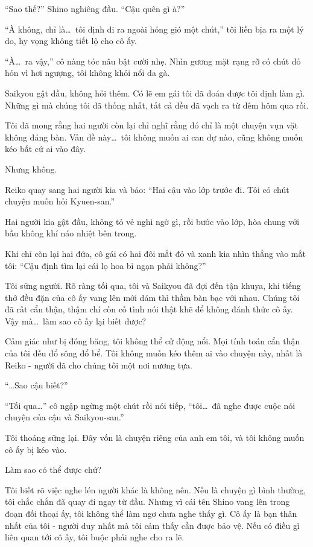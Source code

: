 \documentclass[../main.tex]{subfiles}
\begin{document}
``Sao thế?'' Shino nghiêng đầu. ``Cậu quên gì à?''

``À không, chỉ là\dots\ tôi định đi ra ngoài hóng gió một chút,'' tôi liền bịa ra một lý do, hy vọng không tiết lộ cho cô ấy.

``À\dots\ ra vậy,'' cô nàng tóc nâu bật cười nhẹ. Nhìn gương mặt rạng rỡ có chút đỏ hỏn vì hơi ngượng, tôi không khỏi nổi da gà.

Saikyou gật đầu, không hỏi thêm. Có lẽ em gái tôi đã đoán được tôi định làm gì. Những gì mà chúng tôi đã thống nhất, tất cả đều đã vạch ra từ đêm hôm qua rồi.

Tôi đã mong rằng hai người còn lại chỉ nghĩ rằng đó chỉ là một chuyện vụn vặt không đáng bàn. Vấn đề này\dots\ tôi không muốn ai can dự nào, cũng không muốn kéo bất cứ ai vào đây.

Nhưng không.

Reiko quay sang hai người kia và bảo: ``Hai cậu vào lớp trước đi. Tôi có chút chuyện muốn hỏi Kyuen-san.''

Hai người kia gật đầu, không tỏ vẻ nghi ngờ gì, rồi bước vào lớp, hòa chung với bầu không khí náo nhiệt bên trong.

Khi chỉ còn lại hai đứa, cô gái có hai đôi mắt đỏ và xanh kia nhìn thẳng vào mắt tôi: ``Cậu định tìm lại cái lọ hoa bỉ ngạn phải không?''

Tôi sững người. Rõ ràng tối qua, tôi và Saikyou đã đợi đến tận khuya, khi tiếng thở đều đặn của cô ấy vang lên mới dám thì thầm bàn bạc với nhau. Chúng tôi đã rất cẩn thận, thậm chí còn cố tình nói thật khẽ để không đánh thức cô ấy. Vậy mà\dots\ làm sao cô ấy lại biết được?

Cảm giác như bị đóng băng, tôi không thể cử động nổi. Mọi tính toán cẩn thận của tôi đều đổ sông đổ bể. Tôi không muốn kéo thêm ai vào chuyện này, nhất là Reiko - người đã cho chúng tôi một nơi nương tựa.

``\dots Sao cậu biết?''

``Tối qua\dots'' cô ngập ngừng một chút rồi nói tiếp, ``tôi\dots\ đã nghe được cuộc nói chuyện của cậu và Saikyou-san.''

Tôi thoáng sững lại. Đây vốn là chuyện riêng của anh em tôi, và tôi không muốn cô ấy bị kéo vào.

Làm sao có thể được chứ?


Tôi biết rõ việc nghe lén người khác là không nên. Nếu là chuyện gì bình thường, tôi chắc chắn đã quay đi ngay từ đầu. Nhưng vì cái tên Shino vang lên trong đoạn đối thoại ấy, tôi không thể làm ngơ chưa nghe thấy gì. Cô ấy là bạn thân nhất của tôi - người duy nhất mà tôi cảm thấy cần được bảo vệ. Nếu có điều gì liên quan tới cô ấy, tôi buộc phải nghe cho ra lẽ.
\end{document}
